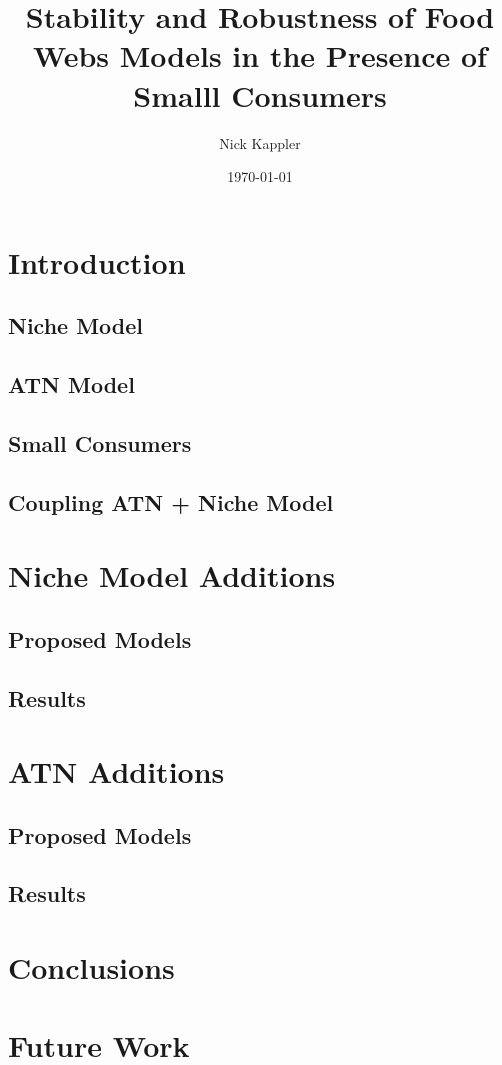 \documentclass{beamer}
\title{Stability and Robustness of Food Webs Models in the Presence of Smalll Consumers}
\author{Nick Kappler}
\date{\today}
\begin{document}
\frame{\titlepage}

\section[Outline]{}
\frame{\tableofcontents}

\section{Introduction}

\subsection{Niche Model}

\subsection{ATN Model}

\subsection{Small Consumers}

\subsection{Coupling ATN + Niche Model}

\section{Niche Model Additions}

\subsection{Proposed Models}

\subsection{Results}

\section{ATN Additions}

\subsection{Proposed Models}

\subsection{Results}

\section{Conclusions}

\section{Future Work}
\end{document}

